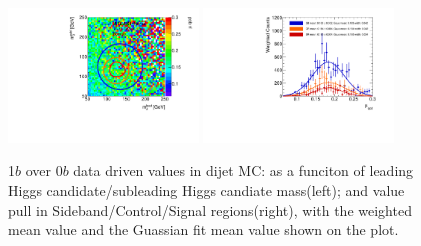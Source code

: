 \begin{figure}[htbp!]
\begin{center}
\includegraphics[angle=270, width=0.45\textwidth]{./figures/boosted/AppendixMuqcdstudy/QCD_OneTag_Incl_mH0H1.pdf}
\includegraphics[angle=270, width=0.45\textwidth]{./figures/boosted/AppendixMuqcdstudy/QCD_OneTag_Incl_mH0H1_pull.pdf}
\caption{1$b$ over 0$b$ data driven \muqcd values in dijet MC: \muqcd as a funciton of leading Higgs candidate/subleading Higgs candiate mass(left); and \muqcd value pull in Sideband/Control/Signal regions(right), with the weighted mean value and the Guassian fit mean value shown on the plot.}
\label{fig:app-muqcd-1b-qcd}
\end{center}
\end{figure}


